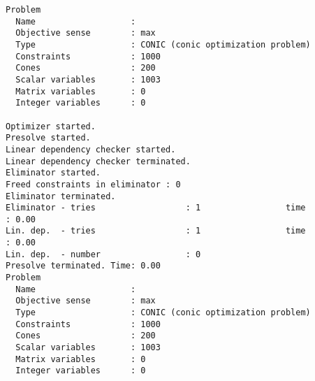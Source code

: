 \documentclass[
  10pt,
  a4paper,
,tablecaptionabove
]{scrartcl}
\begin{document}
\begin{verbatim}
Problem
  Name                   :                 
  Objective sense        : max             
  Type                   : CONIC (conic optimization problem)
  Constraints            : 1000            
  Cones                  : 200             
  Scalar variables       : 1003            
  Matrix variables       : 0               
  Integer variables      : 0               

Optimizer started.
Presolve started.
Linear dependency checker started.
Linear dependency checker terminated.
Eliminator started.
Freed constraints in eliminator : 0
Eliminator terminated.
Eliminator - tries                  : 1                 time                   : 0.00            
Lin. dep.  - tries                  : 1                 time                   : 0.00            
Lin. dep.  - number                 : 0               
Presolve terminated. Time: 0.00    
Problem
  Name                   :                 
  Objective sense        : max             
  Type                   : CONIC (conic optimization problem)
  Constraints            : 1000            
  Cones                  : 200             
  Scalar variables       : 1003            
  Matrix variables       : 0               
  Integer variables      : 0               


\end{verbatim}
\end{document}
